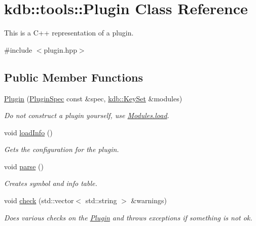 \hypertarget{classkdb_1_1tools_1_1Plugin}{}\section{kdb\+:\+:tools\+:\+:Plugin Class Reference}
\label{classkdb_1_1tools_1_1Plugin}


This is a C++ representation of a plugin.  




{\ttfamily \#include $<$plugin.\+hpp$>$}

\subsection*{Public Member Functions}
\begin{DoxyCompactItemize}
\item 
\mbox{\label{classkdb_1_1tools_1_1Plugin_a8fdab835766bab1d1a992731c6863b9f}} 
\hyperlink{classkdb_1_1tools_1_1Plugin_a8fdab835766bab1d1a992731c6863b9f}{Plugin} (\hyperlink{classkdb_1_1tools_1_1PluginSpec}{Plugin\+Spec} const \&spec, \hyperlink{classkdb_1_1KeySet}{kdb\+::\+Key\+Set} \&modules)
\begin{DoxyCompactList}\small\item\em Do not construct a plugin yourself, use \hyperlink{classkdb_1_1tools_1_1Modules_ae8d8c91745c9f517e6e8a556f1664f69}{Modules.\+load}. \end{DoxyCompactList}\item 
void \hyperlink{classkdb_1_1tools_1_1Plugin_a3a0c6a956d1714002ef9baf8c9d99167}{load\+Info} ()
\begin{DoxyCompactList}\small\item\em Gets the configuration for the plugin. \end{DoxyCompactList}\item 
void \hyperlink{classkdb_1_1tools_1_1Plugin_adfcba2fbdeb436a1083410df804d5fb0}{parse} ()
\begin{DoxyCompactList}\small\item\em Creates symbol and info table. \end{DoxyCompactList}\item 
void \hyperlink{classkdb_1_1tools_1_1Plugin_a5bb3db65b9d87d18787da8cc65eaca65}{check} (std\+::vector$<$ std\+::string $>$ \&warnings)
\begin{DoxyCompactList}\small\item\em Does various checks on the \hyperlink{classkdb_1_1tools_1_1Plugin}{Plugin} and throws exceptions if something is not ok. \end{DoxyCompactList}\item 

\end{DoxyCompactItemize}
